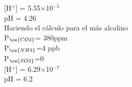 [H$^+$] = 5.55$\times$10$^{-5}$\\
pH = 4.26\\

Haciendo el c\'alculo para el m\'as alcalino\\
P$_{\ce{CO2}}$= 380ppm\\
P$_{\ce{NH3}}$=4 ppb \\
P$_{\ce{SO2}}$=0\\

[H$^+$] = 6.29$\times$10$^{-7}$\\
pH = 6.2\\

  
%   
%  
%  
%   
%    
%     
%      
%       
%        
%         
%         
